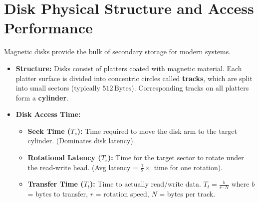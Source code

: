 \documentclass[12pt,a4paper]{article}
\begin{document}
\begin{tcolorbox}[tikzbox, title={Double Buffering Model}]
\centering
{}
\end{tcolorbox}

\section{Disk Physical Structure and Access Performance}

Magnetic disks provide the bulk of secondary storage for modern systems.
\begin{itemize}[leftmargin=*, itemsep=3pt]
  \item \textbf{Structure:} Disks consist of platters coated with magnetic material. Each platter surface is divided into concentric circles called \textbf{tracks}, which are split into small sectors (typically $512\,\text{Bytes}$). Corresponding tracks on all platters form a \textbf{cylinder}.
  \item \textbf{Disk Access Time:}
  \begin{itemize}[leftmargin=*, itemsep=2.5pt, topsep=0pt]
    \item \textbf{Seek Time ($T_s$):} Time required to move the disk arm to the target cylinder. (Dominates disk latency).
    \item \textbf{Rotational Latency ($T_r$):} Time for the target sector to rotate under the read-write head. (Avg latency = $\frac{1}{2} \times$ time for one rotation).
    \item \textbf{Transfer Time ($T_t$):} Time to actually read/write data. $T_t = \frac{b}{r \cdot N}$ where $b$ = bytes to transfer, $r$ = rotation speed, $N$ = bytes per track.
    \end{itemize}
  \end{itemize}
\end{document}
